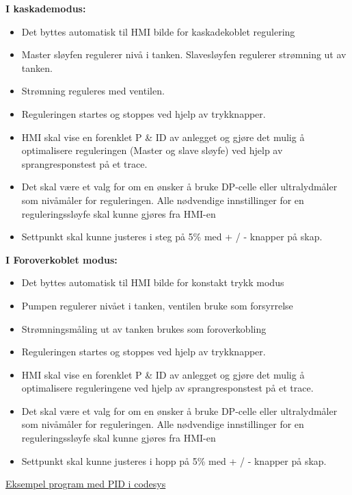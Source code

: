 \textbf{I kaskademodus:}

\begin{itemize}[noitemsep]
	\item Det byttes automatisk til HMI bilde for kaskadekoblet regulering 
	\item Master sløyfen regulerer nivå i tanken. Slavesløyfen regulerer strømning ut av tanken. 
	\item Strømning reguleres med ventilen. 
	\item Reguleringen startes og stoppes ved hjelp av trykknapper.   
	\item HMI skal vise en forenklet P \& ID av anlegget og gjøre det mulig å optimalisere reguleringen (Master og slave sløyfe) ved hjelp av sprangresponstest på et trace.  
	\item Det skal være et valg for om en ønsker å bruke DP-celle eller ultralydmåler som nivåmåler for reguleringen. Alle nødvendige innstillinger for en reguleringssløyfe skal kunne gjøres fra HMI-en 
	\item Settpunkt skal kunne justeres i steg på 5\% med + / - knapper på skap.  

\end{itemize}


\textbf{I Foroverkoblet modus:}

\begin{itemize}[noitemsep]
	\item Det byttes automatisk til HMI bilde for konstakt trykk modus 
	\item Pumpen regulerer nivået i tanken, ventilen bruke som forsyrrelse
	\item Strømningsmåling ut av tanken brukes som foroverkobling
	\item Reguleringen startes og stoppes ved hjelp av trykknapper.   
	\item HMI skal vise en forenklet P \& ID av anlegget og gjøre det mulig å optimalisere reguleringene ved hjelp av sprangresponstest på et trace.  
	\item Det skal være et valg for om en ønsker å bruke DP-celle eller ultralydmåler som nivåmåler for reguleringen. Alle nødvendige innstillinger for en reguleringssløyfe skal kunne gjøres fra HMI-en 
	\item Settpunkt skal kunne justeres i hopp på 5\% med + / - knapper på skap.  

\end{itemize}

\href{https://rfka-my.sharepoint.com/:u:/g/personal/fred-olav_mosdal_skole_rogfk_no/EewzybzUnq5PscHy_uJUvUMB3ufsOB417mgUkhGlC8yQrg?e=rPkbpf}{Eksempel program med PID i codesys}

\vskip 5pt 

\vskip 5pt 


\vskip 10pt 


